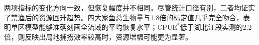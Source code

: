 两项指标的变化方向一致，但恢复幅度并不相同。尽管统计口径有别，二者均证实了禁渔后的资源回升趋势。四大家鱼总生物量与1.8倍的标定值几乎完全吻合，表明单区模型能够准确刻画全流域的平均恢复水平；$\mathrm{CPUE}^*$低于湖北江段实测的2.2倍，则反映出局地捕捞效率较高时，资源增幅可能更为显著。
